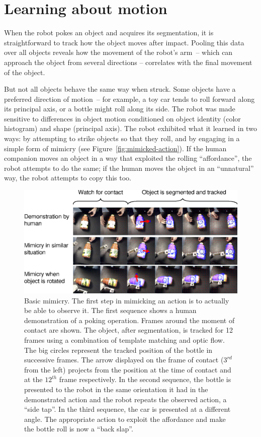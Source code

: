 
\section{Learning about motion}

When the robot pokes an object and acquires its segmentation,
it is straightforward to track how the object moves after impact.
%
Pooling this data over all objects reveals how the movement of the
robot's arm~-- which can approach the object from several directions
-- correlates with the final movement of the object.

But not all objects behave the same way when struck.  
Some objects have a preferred direction of motion~-- for example,
a toy car tends to roll forward along its principal axis,
or a bottle might roll along its side.
%
The robot was made sensitive to differences in object motion
conditioned on object identity (color histogram) and 
shape (principal axis).
The robot exhibited what it learned in two ways:
by
attempting to strike objects so that they roll,
and by engaging in
a simple form of mimicry (see Figure~\ref{fig:mimicked-action}).
If the human companion moves an object in a way that
exploited the rolling ``affordance'', 
the robot attempts to do the same; if the human moves the
object in an ``unnatural'' way, the robot attempts to
copy this too.

\ifnote
\begin{figure}[tb]
\begin{center}
\includegraphics[width=\columnwidth]{fig-mimicry-bottle}
\caption{ 
\label{fig:observed-action}
%
Basic mimicry.  The first step in mimicking an action is to actually
be able to observe it.  The first sequence shows a human demonstration
of a poking operation.  Frames around the moment of contact are shown.
The object, after segmentation, is tracked for 12 frames using a
combination of template matching and optic flow.  The big circles
represent the tracked position of the bottle in successive frames.
The arrow displayed on the frame of contact ($3^{rd}$ from the left)
projects from the position at the time of contact and at the $12^{th}$
frame respectively.
%
In the second sequence, the bottle is presented to the robot in the
same orientation it had in the demonstrated action and the robot
repeats the observed action, a ``side tap''.  In the third sequence,
the car is presented at a different angle.  The appropriate action to
exploit the affordance and make the bottle roll is now a ``back
slap''.
%
}
\end{center}
\end{figure}
\fi

